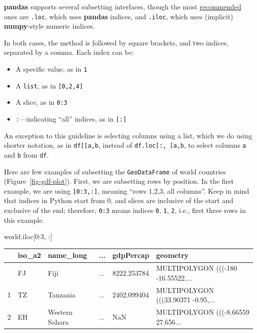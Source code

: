 \documentclass[
  letterpaper,
]{krantz}
\newenvironment{Shaded}{\begin{snugshade}}{\end{snugshade}}
\newcommand{\DecValTok}[1]{\textcolor[rgb]{0.68,0.00,0.00}{#1}}
\newcommand{\NormalTok}[1]{\textcolor[rgb]{0.00,0.23,0.31}{#1}}
\providecommand{\tightlist}{%
  \setlength{\itemsep}{0pt}\setlength{\parskip}{0pt}}\usepackage{longtable,booktabs,array}
\begin{document}
\textbf{pandas} supports several subsetting interfaces, though the most
\href{https://stackoverflow.com/questions/38886080/python-pandas-series-why-use-loc}{recommended}
ones are \texttt{.loc}, which uses \textbf{pandas} indices, and
\texttt{.iloc}, which uses (implicit) \textbf{numpy}-style numeric
indices.

In both cases, the method is followed by square brackets, and two
indices, separated by a comma. Each index can be:

\begin{itemize}
\tightlist
\item
  A specific value, as in \texttt{1}
\item
  A \texttt{list}, as in \texttt{{[}0,2,4{]}}
\item
  A slice, as in \texttt{0:3}
\item
  \texttt{:}---indicating ``all'' indices, as in \texttt{{[}:{]}}
\end{itemize}

An exception to this guideline is selecting columns using a list, which
we do using shorter notation, as in
\texttt{df{[}{[}\textquotesingle{}a\textquotesingle{},\textquotesingle{}b\textquotesingle{}{]}{]}},
instead of
\texttt{df.loc{[}:,\ {[}\textquotesingle{}a\textquotesingle{},\textquotesingle{}b\textquotesingle{}{]}{]}},
to select columns \texttt{\textquotesingle{}a\textquotesingle{}} and
\texttt{\textquotesingle{}b\textquotesingle{}} from \texttt{df}.

Here are few examples of subsetting the \texttt{GeoDataFrame} of world
countries (Figure~\ref{fig-gdf-plot}). First, we are subsetting rows by
position. In the first example, we are using \texttt{{[}0:3,:{]}},
meaning ``rows 1,2,3, all columns''. Keep in mind that indices in Python
start from 0, and slices are inclusive of the start and exclusive of the
end; therefore, \texttt{0:3} means indices \texttt{0}, \texttt{1},
\texttt{2}, i.e., first three rows in this example.

\begin{Shaded}
\begin{Highlighting}[]
\NormalTok{world.iloc[}\DecValTok{0}\NormalTok{:}\DecValTok{3}\NormalTok{, :]}
\end{Highlighting}
\end{Shaded}

\begin{longtable}[]{@{}llllll@{}}
\toprule\noalign{}
& iso\_a2 & name\_long & ... & gdpPercap & geometry \\
\midrule\noalign{}
\endhead
\bottomrule\noalign{}
\endlastfoot
0 & FJ & Fiji & ... & 8222.253784 & MULTIPOLYGON (((-180
-16.55522,... \\
1 & TZ & Tanzania & ... & 2402.099404 & MULTIPOLYGON (((33.90371
-0.95,... \\
2 & EH & Western Sahara & ... & NaN & MULTIPOLYGON (((-8.66559
27.656... \\
\end{longtable}
\end{document}
